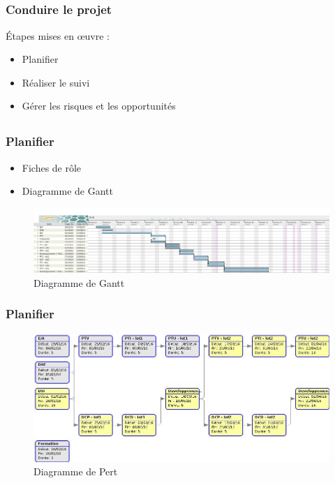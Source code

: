 \speaker{\Sergi{}}
\subsection{} %

\begin{frame}
\frametitle{Conduire le projet}
Étapes mises en \oe{}uvre :
	\begin{itemize}
		\item Planifier
		\item Réaliser le suivi
		\item Gérer les risques et les opportunités
	\end{itemize}
\end{frame}

\subsection{}

\begin{frame}
\frametitle{Planifier}
\begin{itemize}
	\item Fiches de rôle
	\item Diagramme de Gantt
\end{itemize}
\begin{figure}
\begin{center}
	\includegraphics[scale=0.15]{images/exempleGantt.jpg}
	\caption{Diagramme de Gantt}
	\label{DG}
\end{center}
\end{figure}
\end{frame}

\begin{frame}
\frametitle{Planifier}
\begin{figure}
\includegraphics[scale=0.3]{images/exemplePert.jpg}
\caption{Diagramme de Pert}
\label{DP}
\end{figure}
\end{frame}

